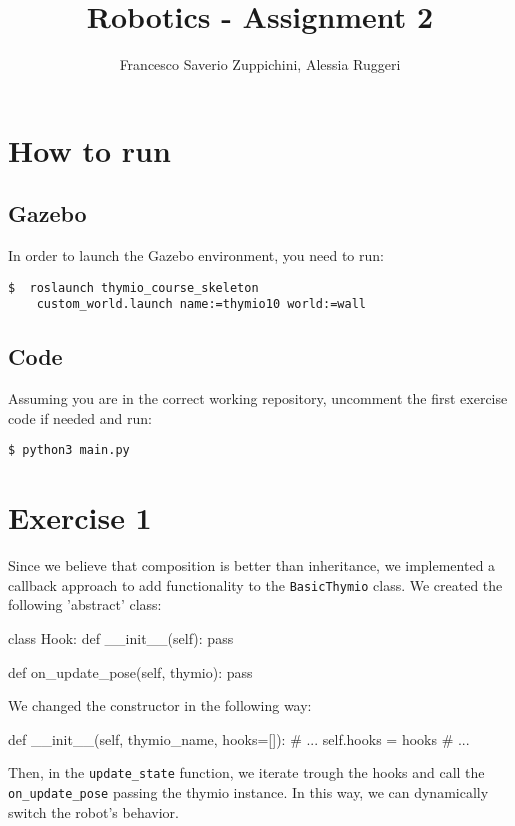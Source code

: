 \documentclass[11pt]{article}
\title{Robotics - Assignment 2}
\author{Francesco Saverio Zuppichini, Alessia Ruggeri}
\begin{document}
\maketitle
\section{How to run}
\subsection{Gazebo}
In order to launch the Gazebo environment, you need to run:
\begin{lstlisting}
$  roslaunch thymio_course_skeleton
	custom_world.launch name:=thymio10 world:=wall	
\end{lstlisting}
\subsection{Code}
Assuming you are in the correct working repository, uncomment the first exercise code if needed and run:
\begin{lstlisting}
$ python3 main.py	
\end{lstlisting}
\section{Exercise 1}
Since we believe that composition is better than inheritance, we implemented a callback approach to add functionality to the \texttt{BasicThymio} class. We created the following 'abstract' class:

\begin{python}
class Hook:
    def __init__(self):
        pass

    def on_update_pose(self, thymio):
        pass
	
\end{python}

We changed the constructor in the following way:
\begin{python}

def __init__(self, thymio_name, hooks=[]):
	# ...
	self.hooks = hooks
	# ...
\end{python}

Then, in the \texttt{update\_state} function, we iterate trough the hooks and call the \texttt{on\_update\_pose} passing the thymio instance. In this way, we can dynamically switch the robot's behavior.
\end{document}
